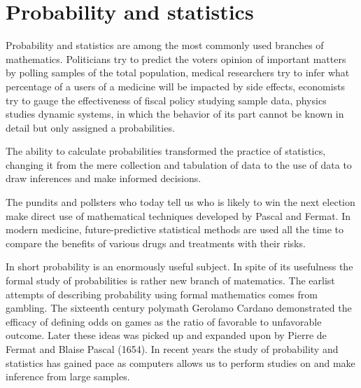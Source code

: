 \chapter{Probability and statistics}

Probability and statistics are among the most commonly used branches of mathematics. Politicians try to predict the voters opinion of important matters by polling samples of the total population, medical researchers try to infer what percentage of a users of a medicine will be impacted by side effects, economists try to gauge the effectiveness of fiscal policy studying sample data, physics studies dynamic systems, in which the behavior of its part cannot be known in detail but only assigned a probabilities.

The ability to calculate probabilities transformed the practice of statistics, changing it from the mere collection and tabulation of data to the use of data to draw inferences and make informed decisions.

The pundits and pollsters who today tell us who is likely to win the next election make direct use of mathematical techniques developed by Pascal and Fermat. In modern medicine, future-predictive statistical methods are used all the time to compare the benefits of various drugs and treatments with their risks.

In short probability is an enormously useful subject. In spite of its usefulness the formal study of probabilities is rather new branch of matematics. The earlist attempts of describing probability using formal mathematics comes from gambling. The sixteenth century polymath Gerolamo Cardano demonstrated the efficacy of defining odds on games as the ratio of favorable to unfavorable outcome. Later these ideas was picked up and expanded upon by  Pierre de Fermat and Blaise Pascal (1654). In recent years the study of probability and statistics has gained pace as computers allows us to perform studies on and make inference from large samples.

